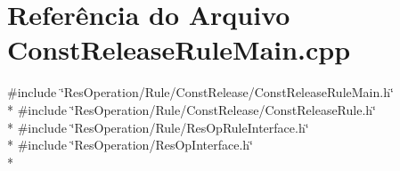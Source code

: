 \section{Referência do Arquivo Const\+Release\+Rule\+Main.\+cpp}
\label{_rule_2_const_release_2_const_release_rule_main_8cpp}
{\ttfamily \#include \char`\"{}Res\+Operation/\+Rule/\+Const\+Release/\+Const\+Release\+Rule\+Main.\+h\char`\"{}}\\*
{\ttfamily \#include \char`\"{}Res\+Operation/\+Rule/\+Const\+Release/\+Const\+Release\+Rule.\+h\char`\"{}}\\*
{\ttfamily \#include \char`\"{}Res\+Operation/\+Rule/\+Res\+Op\+Rule\+Interface.\+h\char`\"{}}\\*
{\ttfamily \#include \char`\"{}Res\+Operation/\+Res\+Op\+Interface.\+h\char`\"{}}\\*
